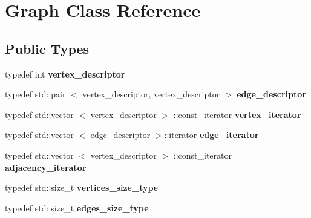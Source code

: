 \hypertarget{classGraph}{\section{\-Graph \-Class \-Reference}
\label{classGraph}
}
\subsection*{\-Public \-Types}
\begin{DoxyCompactItemize}
\item 
\hypertarget{classGraph_adeba8286db7d42e6ffac2554b314d61d}{typedef int {\bfseries vertex\-\_\-descriptor}}\label{classGraph_adeba8286db7d42e6ffac2554b314d61d}

\item 
\hypertarget{classGraph_ad2d4a30b7897a48729fa7e3bee649d04}{typedef std\-::pair\*
$<$ vertex\-\_\-descriptor, \*
vertex\-\_\-descriptor $>$ {\bfseries edge\-\_\-descriptor}}\label{classGraph_ad2d4a30b7897a48729fa7e3bee649d04}

\item 
\hypertarget{classGraph_aee10ac35c0bad19ebc93f33eb08e149d}{typedef std\-::vector\*
$<$ vertex\-\_\-descriptor $>$\*
\-::const\-\_\-iterator {\bfseries vertex\-\_\-iterator}}\label{classGraph_aee10ac35c0bad19ebc93f33eb08e149d}

\item 
\hypertarget{classGraph_adffc89d0caa85ff93b4e17d8be186e8f}{typedef std\-::vector\*
$<$ edge\-\_\-descriptor $>$\-::iterator {\bfseries edge\-\_\-iterator}}\label{classGraph_adffc89d0caa85ff93b4e17d8be186e8f}

\item 
\hypertarget{classGraph_ae2e213b66e04571e0436f26a2722416e}{typedef std\-::vector\*
$<$ vertex\-\_\-descriptor $>$\*
\-::const\-\_\-iterator {\bfseries adjacency\-\_\-iterator}}\label{classGraph_ae2e213b66e04571e0436f26a2722416e}

\item 
\hypertarget{classGraph_ac1e19ecbf236d08dff611584e4c9403e}{typedef std\-::size\-\_\-t {\bfseries vertices\-\_\-size\-\_\-type}}\label{classGraph_ac1e19ecbf236d08dff611584e4c9403e}

\item 
\hypertarget{classGraph_a1924745b438f862ba9aa7cd0ff5b7da5}{typedef std\-::size\-\_\-t {\bfseries edges\-\_\-size\-\_\-type}}\label{classGraph_a1924745b438f862ba9aa7cd0ff5b7da5}

\end{DoxyCompactItemize}
